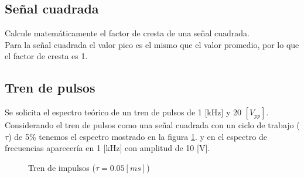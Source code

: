 \documentclass{article}
\begin{document}
\subsection{Señal cuadrada}

Calcule matemáticamente el factor de cresta de una señal cuadrada.\\

Para la señal cuadrada el valor pico es el mismo que el valor promedio, por lo que el factor de cresta es 1.\\

\subsection{Tren de pulsos}

Se solicita el espectro teórico de un tren de pulsos de 1 [kHz] y 20 $[V_{pp}]$.\\

Considerando el tren de pulsos como una señal cuadrada con un ciclo de trabajo ($\tau$) de 5\% tenemos el espectro mostrado en la figura \ref{fig:senialCuadrada5porc}. y en el espectro de frecuencias aparecería en 1 [kHz] con amplitud de 10 [V].\\


\begin{figure}[h!]
    \centering
    
   
\caption{Tren de impulsos ($\tau=0.05[ms]$)}
    \label{fig:senialCuadrada5porc}
 
\end{figure}
\end{document}
